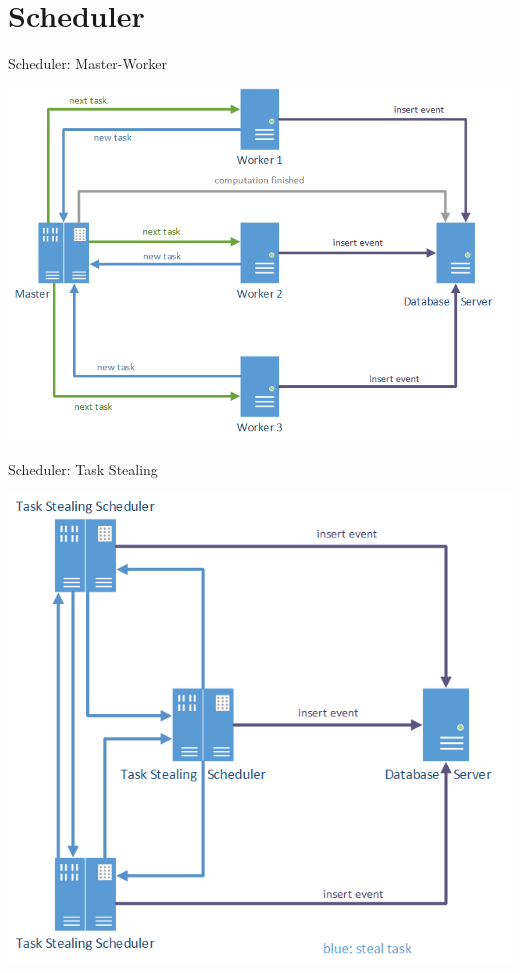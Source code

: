 
\section{Scheduler}

	\begin{frame}{Scheduler: Master-Worker}
		\centerline{\includegraphics[scale=0.5]{images/master}}
	\end{frame}
	\begin{frame}{Scheduler: Task Stealing}
		\centerline{\includegraphics[scale=0.5]{images/taskstealing}}
	\end{frame}

